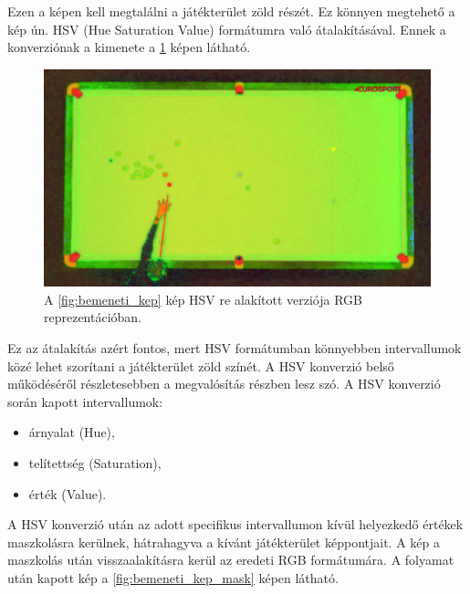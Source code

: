\par Ezen a képen kell megtalálni a játékterület zöld részét. Ez könnyen megtehető a kép ún. HSV (Hue Saturation Value) formátumra való átalakításával. Ennek a konverziónak a kimenete a \ref{fig:bemeneti_kep_hsv} képen látható.

\begin{figure}[!ht]
    \centering
    \includegraphics[width=115mm, keepaspectratio]{figures/input_screen_hsv.png}
    \caption{A \ref{fig:bemeneti_kep} kép HSV re alakított verziója RGB reprezentációban.}
    \label{fig:bemeneti_kep_hsv}
\end{figure}

\par Ez az átalakítás azért fontos, mert HSV formátumban könnyebben intervallumok közé lehet szorítani a játékterület zöld színét. A HSV konverzió belső működéséről részletesebben a megvalósítás részben lesz szó.
\newline A HSV konverzió során kapott intervallumok:
\begin{itemize}
    \setlength\itemsep{-2pt}
    \item árnyalat (Hue),
    \item telítettség (Saturation),
    \item érték (Value).
\end{itemize}

\par A HSV konverzió után az adott specifikus intervallumon kívül helyezkedő értékek maszkolásra kerülnek, hátrahagyva a kívánt játékterület képpontjait. A kép a maszkolás után visszaalakításra kerül az eredeti RGB formátumára. A folyamat után kapott kép a \ref{fig:bemeneti_kep_mask} képen látható.

